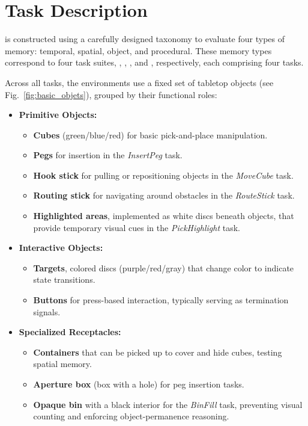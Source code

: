 \clearpage
\section{Task Description}
\label{sec:appx_task_desc}
\benchname\xspace is constructed using a carefully designed taxonomy to evaluate four types of memory: temporal, spatial, object, and procedural. These memory types correspond to four task suites, \TSone, \TStwo, \TSthree, and \TSfour, respectively, each comprising four tasks.

Across all tasks, the environments use a fixed set of tabletop objects (see Fig.~\ref{fig:basic_objets}), grouped by their functional roles:

\begin{itemize}
    \item \textbf{Primitive Objects:}
    \begin{itemize}
        \item \textbf{Cubes} (green/blue/red) for basic pick-and-place manipulation.
        \item \textbf{Pegs} for insertion in the \textit{InsertPeg} task.
        \item \textbf{Hook stick} for pulling or repositioning objects in the \textit{MoveCube} task.
        \item \textbf{Routing stick} for navigating around obstacles in the \textit{RouteStick} task.
        \item \textbf{Highlighted areas}, implemented as white discs beneath objects, that provide temporary visual cues in the \textit{PickHighlight} task.
    \end{itemize}

    \item \textbf{Interactive Objects:}
    \begin{itemize}
        \item \textbf{Targets}, colored discs (purple/red/gray) that change color to indicate state transitions.
        \item \textbf{Buttons} for press-based interaction, typically serving as termination signals.
    \end{itemize}

    \item \textbf{Specialized Receptacles:}
    \begin{itemize}
        \item \textbf{Containers} that can be picked up to cover and hide cubes, testing spatial memory.
        \item \textbf{Aperture box} (box with a hole) for peg insertion tasks.
        \item \textbf{Opaque bin} with a black interior for the \textit{BinFill} task, preventing visual counting and enforcing object-permanence reasoning.
    \end{itemize}
\end{itemize}




